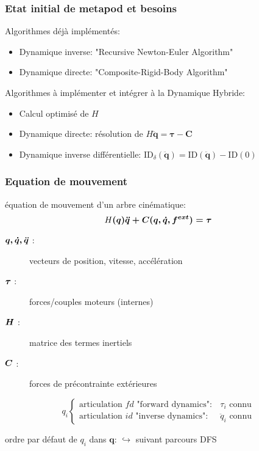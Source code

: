 \documentclass[11pt]{beamer}
\begin{document}
\begin{frame}
  \frametitle{Etat initial de metapod et besoins}
 
  Algorithmes déjà implémentés:
  \begin{itemize}
  \item Dynamique inverse:	"Recursive Newton-Euler Algorithm"
  \item Dynamique directe:	"Composite-Rigid-Body Algorithm"
  \end{itemize}
  \bigskip
  Algorithmes à implémenter et intégrer à la Dynamique Hybride:
  \begin{itemize}
  \item Calcul optimisé de $H$
  \item Dynamique directe:	résolution de $H \boldsymbol{\ddot{q} = \tau - C}$
  \item Dynamique inverse différentielle: $\mathrm{ID}_{\delta}(\boldsymbol{\ddot{q}}) = \mathrm{ID}(\boldsymbol{\ddot{q}}) - \mathrm{ID}(0)$
  \end{itemize}
  
\end{frame}

\begin{frame}

  \frametitle{Equation de mouvement}
  
  \begin{block}{équation de mouvement d'un arbre cinématique:}
  \begin{equation} \label{equ_equationMvt}
	H\boldsymbol{(q) \ddot{q} + C(q,\dot{q},f^{ext}) = \tau}
	\end{equation}
  \end{block}
  
  \begin{description}
    \item[$\boldsymbol{q, \dot{q}, \ddot{q}}$ :] vecteurs de position, vitesse, accélération
    \item[$\boldsymbol{\tau}$ :] forces/couples moteurs (internes)
    \item[$\boldsymbol{H}$ :] matrice des termes inertiels
    \item[$\boldsymbol{C}$ :] forces de précontrainte extérieures
  \end{description}
  
  \begin{equation*}
  q_i
  \begin{cases}
  \text{articulation $fd$ "forward dynamics"}: &\tau_i \text{ connu} \\
  \text{articulation $id$ "inverse dynamics"}: &\ddot{q}_i \text{ connu}
  \end{cases}
  \end{equation*}
  
  ordre par défaut de $q_i$ dans $\boldsymbol{q}$:
  $\hookrightarrow$ suivant parcours DFS
  

\end{frame}
\end{document}
